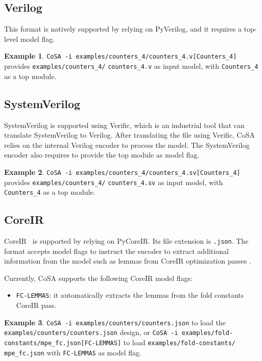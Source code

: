 \documentclass{article}
\theoremstyle{definition}
\newtheorem{example}{Example}[section]
\begin{document}
\subsection{Verilog}
This format is natively supported by relying on PyVerilog, and it
requires a top-level model flag.

\begin{example}
  \texttt{CoSA -i examples/counters\_4/counters\_4.v[Counters\_4]}
  provides \texttt{examples/counters\_4/} \texttt{counters\_4.v} as input model,
  with \texttt{Counters\_4} as a top module.
\end{example}

\subsection{SystemVerilog}
SystemVerilog is supported using Verific, which is an industrial tool
that can translate SystemVerilog to Verilog. After translating the
file using Verific, CoSA relies on the internal Verilog encoder to
process the model. The SystemVerilog encoder also requires to provide
the top module as model flag.

\begin{example}
  \texttt{CoSA -i examples/counters\_4/counters\_4.sv[Counters\_4]}
  provides \texttt{examples/counters\_4/} \texttt{counters\_4.sv} as input model,
  with \texttt{Counters\_4} as a top module.
\end{example}

\subsection{CoreIR}
CoreIR~\cite{CoreIR} is supported by relying on PyCoreIR. Its file
extension is \texttt{.json}. The format accepts model flags to
instruct the encoder to extract additional information from the model
such as lemmas from CoreIR optimization passes \cite{cosa-paper}.

Currently, CoSA supports the following CoreIR model flags:
\begin{itemize}
\item \texttt{FC-LEMMAS}: it automatically extracts the lemmas from
  the fold constants CoreIR pass.
\end{itemize}

\begin{example}
  \texttt{CoSA -i examples/counters/counters.json} to load the
  \texttt{examples/counters/counters.json} design, or \texttt{CoSA -i
    examples/fold-constants/mpe\_fc.json[FC-LEMMAS]} to load
  \texttt{examples/fold-constants/} \texttt{mpe\_fc.json} with
  \texttt{FC-LEMMAS} as model flag.
\end{example}
\end{document}
